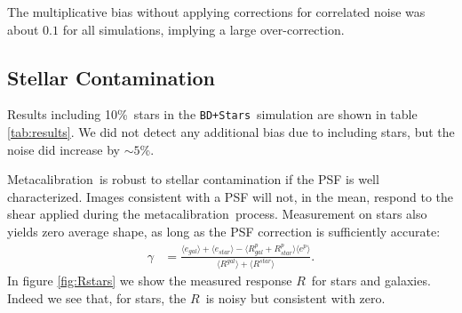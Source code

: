 \documentclass[usegraphicx,usenatbib]{mn2e}
\newcommand{\mest}{e}
\newcommand{\mcal}{metacalibration}
\newcommand{\Mcal}{Metacalibration}
\newcommand{\mcalR}{$R$}
\newcommand{\nsimNStar}{$4 \times 10^7$}
\newcommand{\nsimNstarperc}{10\%}
\newcommand{\bdsim}{\texttt{BD}}
\newcommand{\bdstar}{\texttt{BD+Stars}}
\begin{document}
The multiplicative bias without applying corrections for correlated noise
was about $0.1$ for all simulations, implying a large over-correction.


\subsection{Stellar Contamination} \label{sec:stars}

Results including \nsimNstarperc\ stars in the \bdstar\ simulation are shown in
table \ref{tab:results}. We did not detect any additional bias due to including
stars, but the noise did increase by $\sim 5$\%.


\Mcal\ is robust to stellar contamination if the PSF is well
characterized.  Images consistent with a PSF will not, in the mean, respond to the shear
applied during the \mcal\ process.  Measurement on stars also yields zero average shape, as
long as the PSF correction is sufficiently accurate:
\begin{align}
    \gamma &= \frac{ \langle \mest_{gal} \rangle + \langle \mest_{star} \rangle - \langle R^p_{gal} + R^p_{star} \rangle \langle \mest^p \rangle }{ \langle R^{gal} \rangle + \langle R^{star} \rangle}.
\end{align}
In figure \ref{fig:Rstars} we show the measured response \mcalR\ for stars
and galaxies.  Indeed we see that, for stars, the \mcalR\ is noisy but consistent with
zero.
\end{document}
